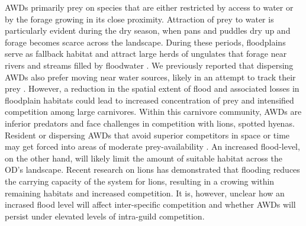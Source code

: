 \documentclass[abstract=on,10pt,a4paper,bibliography=totocnumbered]{article}
\begin{document}
AWDs primarily prey on species that are either restricted by access to water or
by the forage growing in its close proximity. Attraction of prey to water is
particularly evident during the dry season, when pans and puddles dry up and
forage becomes scarce across the landscape. During these periods, floodplains
serve as fallback habitat and attract large herds of ungulates that forage near
rivers and streams filled by floodwater \citep{Bonyongo.2005, Bennitt.2014}. We
previously reported that dispersing AWDs also prefer moving near water sources,
likely in an attempt to track their prey \citep{Hofmann.2021}. However, a
reduction in the spatial extent of flood and associated losses in floodplain
habitats could lead to increased concentration of prey and intensified
competition among large carnivores. Within this carnivore community, AWDs are
inferior predators and face challenges in competition with lions, spotted
hyenas. Resident or dispersing AWDs that avoid superior competitors in space or
time may get forced into areas of moderate prey-availability \citep{Droge.2017}.
An increased flood-level, on the other hand, will likely limit the amount of
suitable habitat across the OD's landscape. Recent research on lions has
demonstrated that flooding reduces the carrying capacity of the system for
lions, resulting in a crowing within remaining habitats and increased
competition. It is, however, unclear how an incrased flood level will affect
inter-specific competition and whether AWDs will persist under elevated levels
of intra-guild competition.
\end{document}
